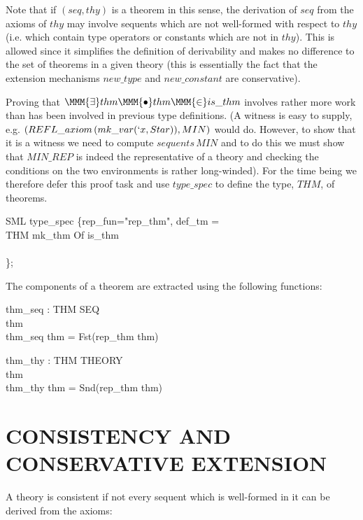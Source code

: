 \documentclass[a4paper,11pt,titlepage]{article}
\begin{document}
\begin{titlepage}
Note that if $(seq, thy)$ is a theorem in this sense,
the derivation of $seq$ from the axioms of $thy$ may
involve sequents which are not well-formed with respect
to $thy$ (i.e. which contain type operators or constants
which are not in $thy$). This is allowed since it simplifies
the definition of derivability and makes no difference
to the set of theorems in a given theory (this is essentially
the fact that the extension mechanisms $new\_type$ and
$new\_constant$ are conservative).

Proving that $\MMM{\exists}thm\MMM{\bullet}thm \MMM{\in} is\_thm$ involves rather more
work than has been involved in previous type definitions.
(A witness is easy to supply, e.g. $(REFL\_axiom\,(mk\_var(`x, Star)), MIN)$ would do. However, to show that it is a witness
we need to compute $sequents\,MIN$ and to do this we
must show that $MIN\_REP$ is indeed the representative
of a theory and checking the conditions on the two
environments is rather long-winded).
For the time being we therefore defer this proof task
and use $type\_spec$ to define the type, $THM$,
of theorems.

\begin{GFT}{SML}
\+type\_spec \{rep\_fun="rep\_thm", def\_tm = \PrKM{}\\
\+	\PrNL{}THM\PrNN{} \MMM{\simeq} \PrNL{}mk\_thm\PrNN{} Of is\_thm\\
\+\PrKO{}\\
\+\};\\
\end{GFT}
The components of a theorem are extracted using
the following functions:
\begin{HOLConst}
\+	\PrNL{}thm\_seq\PrNN{} : THM \MMM{\rightarrow} SEQ\\
\PrPH{}
\+	\MMM{\forall} thm \MMM{\bullet}\\
\+	thm\_seq thm = Fst(rep\_thm thm)\\
\end{HOLConst}
\begin{HOLConst}
\+	\PrNL{}thm\_thy\PrNN{} : THM \MMM{\rightarrow} THEORY\\
\PrPH{}
\+	\MMM{\forall} thm \MMM{\bullet}\\
\+	thm\_thy thm = Snd(rep\_thm thm)\\
\end{HOLConst}
\section{CONSISTENCY AND CONSERVATIVE EXTENSION}
\label{CONSISTENCY}
A theory is consistent if not every sequent which
is well-formed in it can be derived from the axioms:


\end{titlepage}
\end{document}

